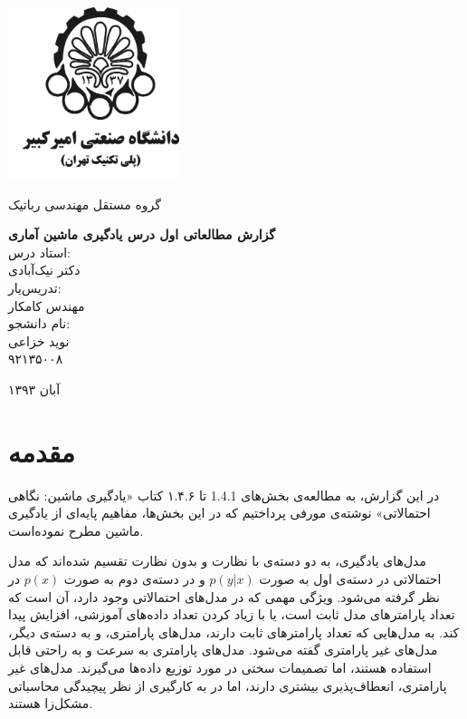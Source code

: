 \documentclass[11.5pt,a4paper]{article}
\newcommand{\nocontentsline}[3]{}
\newcommand{\tocless}[2]{\bgroup\let\addcontentsline=\nocontentsline#1{#2}\egroup}
\begin{document}
\thispagestyle{empty}
\vspace*{-28mm}
\centerline{\includegraphics[height=5cm]{logo.png}}

\begin{center}
\vspace{-2mm}
{\large
گروه مستقل مهندسی رباتیک
\\[2.1cm]
}

{\large
\textbf{گزارش مطالعاتی اول درس یادگیری ماشین آماری}
\\[2cm]

استاد درس:
\\[.5cm]
{\Large
دکتر نیک‌آبادی}
\\[1.5cm]
\large 
تدریس‌یار:
\\[.5cm]
{\Large
مهندس کامکار}
\\[1.5cm]

\large 
نام دانشجو:
\\[.5cm]
{\Large
نوید خزاعی}
\\[.5cm]
۹۲۱۳۵۰۰۸
\\[1.5cm]
}

{\large
آبان ۱۳۹۳
}
\end{center}

\newpage
\tocless\tableofcontents
\newpage 
\newpage
\baselineskip=0.75cm
\section{مقدمه}
در این گزارش، به مطالعه‌ی بخش‌های 1.4.1 تا ۱.۴.۶ کتاب «یادگیری ماشین: نگاهی احتمالاتی» نوشته‌ی مورفی
پرداختیم که در این بخش‌ها، مفاهیم پایه‌ای از یادگیری ماشین مطرح نموده‌است. 

مدل‌های یادگیری، به دو دسته‌ی با نظارت و بدون نظارت تقسیم شده‌اند که مدل احتمالاتی در دسته‌ی اول به صورت
$p(y|x)$
و در دسته‌ی دوم به صورت
$p(x)$
در نظر گرفته می‌شود. ویژگی مهمی که در مدل‌های احتمالاتی وجود دارد، آن است که تعداد پارامترهای مدل ثابت است، یا با زیاد کردن تعداد داده‌های آموزشی، افزایش پیدا کند. به مدل‌هایی که تعداد پارامترهای ثابت دارند، مدل‌های پارامتری، و به دسته‌ی دیگر، مدل‌های غیر پارامتری گفته می‌شود. مدل‌های پارامتری به سرعت و به راحتی قابل استفاده هستند، اما تصمیمات سختی در مورد توزیع داده‌ها می‌گیرند. مدل‌های غیر پارامتری، انعطاف‌پذیری بیشتری دارند، اما در به کارگیری از نظر پیچیدگی محاسباتی مشکل‌زا هستند. 
\end{document}
